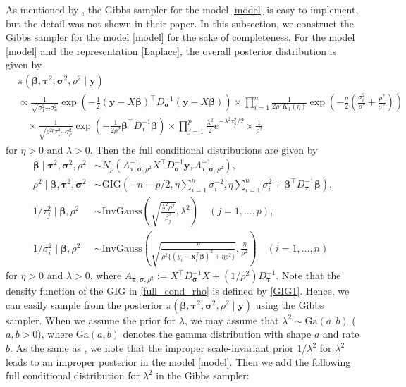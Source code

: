 \documentclass[11pt]{article}
\theoremstyle{plain}
\theoremstyle{definition}
\begin{document}
As mentioned by \cite{PC08}, the Gibbs sampler for the model \eqref{model} is easy to implement, but the detail  was not shown in their paper. In this subsection, we construct the Gibbs sampler for the model \eqref{model} for the sake of completeness. For the model \eqref{model} and the representation \eqref{Laplace}, the overall posterior distribution is given by 
\begin{align*}
&\pi(\bm{\beta},\bm{\tau}^2,\bm{\sigma}^2,\rho^2 \mid \bm{y})\\
&\propto \frac{1}{\sqrt{\sigma_1^2 \cdots \sigma_n^2}}\exp\left(-\frac{1}{2} (\bm{y}-X\bm{\beta})^{\top} D_{\bm{\sigma}}^{-1} (\bm{y}-X\bm{\beta})\right)  \times \prod_{i=1}^n \frac{1}{2\rho^2 K_1(\eta)} \exp\left(-\frac{\eta}{2}\left(\frac{\sigma_i^2}{\rho^2}+\frac{\rho^2}{\sigma_i^2}\right)\right) \\
&\quad \times \frac{1}{\sqrt{\rho^{2p} \tau_1^2\cdots \tau_p^2}} \exp\left(-\frac{1}{2\rho^2}\bm{\beta}^{\top}D_{\bm{\tau}}^{-1}\bm{\beta}\right)\times \prod_{j=1}^p \frac{\lambda^2}{2}e^{-\lambda^2 \tau_j^2/2} \times \frac{1}{\rho^2} 
\end{align*}
for $\eta>0$ and $\lambda>0$. Then the full conditional distributions are given by 
\begin{align}
\bm{\beta} \mid \bm{\tau}^2,\bm{\sigma}^2,\rho^2 & \sim N_p\left(A_{\bm{\tau},\bm{\sigma},\rho^2}^{-1}X^{\top}D_{\bm{\sigma}}^{-1}\bm{y},  A_{\bm{\tau},\bm{\sigma},\rho^2}^{-1}  \right),\label{full_cond_beta}\\
\rho^2 \mid \bm{\beta},\bm{\tau}^2,\bm{\sigma}^2& \sim \mathrm{GIG}\left(-n-p/2, \eta\sum_{i=1}^n \sigma_i^{-2}, \eta \sum_{i=1}^n \sigma_i^2 +\bm{\beta}^{\top}D_{\bm{\tau}}^{-1} \bm{\beta}\right),\label{full_cond_rho}\\
1/\tau_j^2 \mid \bm{\beta},\rho^2& \sim \mathrm{InvGauss}\left(\sqrt{\frac{\lambda^2 \rho^2}{\beta_j^2}},\lambda^2\right) \quad (j=1,\dots, p),\label{full_cond_tau}\\
1/\sigma_i^2 \mid \bm{\beta},\rho^2&\sim \mathrm{InvGauss}\left(\sqrt{\frac{\eta}{\rho^2\{(y_i-\bm{x}_i^{\top}\bm{\beta})^2 +\eta \rho^2\}}},\frac{\eta}{\rho^2}\right)  \quad (i=1,\dots,n)\label{full_cond_sigma}
\end{align}
for $\eta>0$ and $\lambda>0$, where $A_{\bm{\tau},\bm{\sigma},\rho^2}:=X^{\top}D_{\bm{\sigma}}^{-1}X+(1/\rho^2)D_{\bm{\tau}}^{-1}$. Note that the density function of the GIG in \eqref{full_cond_rho} is defined by \eqref{GIG1}. Hence, we can easily sample from the posterior $\pi(\bm{\beta},\bm{\tau}^2,\bm{\sigma}^2,\rho^2 \mid \bm{y})$ using the Gibbs sampler. When we assume the prior for $\lambda$, we may assume that $\lambda^2 \sim \mathrm{Ga}(a,b)$ ($a,b>0$), where $\mathrm{Ga}(a,b)$ denotes the gamma distribution with shape $a$ and rate $b$. As the same as \cite{PC08}, we note that the improper scale-invariant prior $1/\lambda^2$ for $\lambda^2$ leads to an improper posterior in the model \eqref{model}. Then we add the following full conditional distribution for $\lambda^2$ in the Gibbs sampler:
\end{document}
